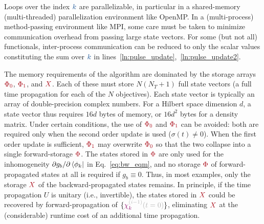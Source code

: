 \documentclass[aps,pra,twocolumn,notitlepage,letterpaper]{revtex4}
\newcommand{\VarScalar}[1]{{\color{clVarScalar}#1}}
\newcommand{\VarState}[1]{\ensuremath{\textcolor{clVarState}{#1}}}
\newcommand{\PropAnnotation}[1]{\textcolor{black!30}{#1}}
\newcommand{\VarPropState}[4]{\ensuremath{\VarState{#1}_{\textcolor{clVarState}{#2}}^{\PropAnnotation{#3}}\PropAnnotation{(#4)}}}  %
\newcommand{\VarArray}[1]{{\color{clVarArray}#1}}
\begin{document}
Loops over the index $\VarScalar{k}$ are parallelizable, in particular in a
shared-memory (multi-threaded) parallelization environment like OpenMP. In a
(multi-process) method-passing environment like MPI, some care must be taken to
minimize communication overhead from passing large state vectors.
For some (but not all) functionals, inter-process communication can be reduced
to only the scalar values constituting the sum over $\VarScalar{k}$ in
lines~\ref{ln:pulse_update},~\ref{ln:pulse_update2}.

The memory requirements of the algorithm are dominated by the storage arrays
$\VarArray{\Phi_0}$, $\VarArray{\Phi_1}$, and $\VarArray{X}$.
Each of these must store $N (N_T + 1)$ full state vectors (a full time
propagation for each of the $N$ objectives). Each state vector is typically an
array of double-precision complex numbers.
For a Hilbert space dimension $d$, a state vector thus requires $16 d$ bytes of
memory, or $16 d^2$ bytes for a density matrix.
Under certain conditions, the use of $\VarArray{\Phi_0}$ and $\VarArray{\Phi_1}$
can be avoided: both are required only when the second order update is used
($\sigma(t) \neq 0$). When the first order update is sufficient,
$\VarArray{\Phi_1}$ may overwrite $\VarArray{\Phi_0}$ so that the two collapse
into a single forward-storage $\VarArray{\Phi}$.
The states stored in $\VarArray{\Phi}$ are only used for the inhomogeneity
$\partial g_b / \partial \bra{\phi_k}$ in Eq.~\eqref{eq:bw_eqm}, and no storage
$\VarArray{\Phi}$ of forward-propagated states at all is required if $g_b \equiv
0$.
Thus, in most examples, only the storage $\VarArray{X}$ of the
backward-propagated states remains.
In principle, if the time propagation $U$ is unitary (i.e., invertible), the
states stored in $\VarArray{X}$ could be recovered by forward-propagation of
$\{\VarPropState{\chi}{k}{(i-1)}{t=0}\}$, eliminating $\VarArray{X}$ at the
(considerable) runtime cost of an additional time propagation.

\onecolumngrid
\end{document}
